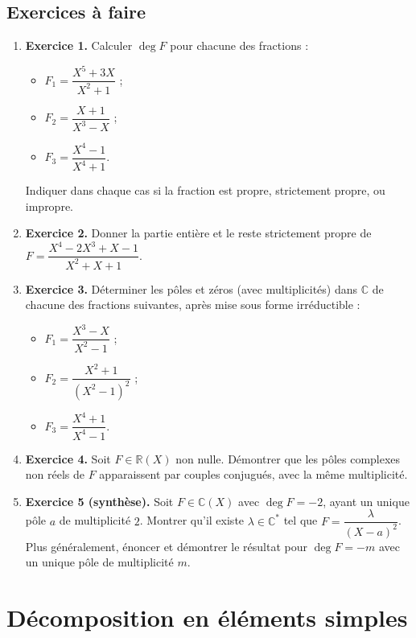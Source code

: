 \documentclass[12pt,a4paper]{report}
\theoremstyle{definition}
\theoremstyle{remark}
\begin{document}
\subsection{Exercices à faire}
\begin{enumerate}
    \item \textbf{Exercice 1.} Calculer $\deg F$ pour chacune des fractions :
    \begin{itemize}
        \item $F_1 = \dfrac{X^5 + 3X}{X^2 + 1}$ ;
        \item $F_2 = \dfrac{X + 1}{X^3 - X}$ ;
        \item $F_3 = \dfrac{X^4 - 1}{X^4 + 1}$.
    \end{itemize}
    Indiquer dans chaque cas si la fraction est propre, strictement propre, ou impropre.
    \item \textbf{Exercice 2.} Donner la partie entière et le reste strictement propre de $F = \dfrac{X^4 - 2X^3 + X - 1}{X^2 + X + 1}$.
    \item \textbf{Exercice 3.} Déterminer les pôles et zéros (avec multiplicités) dans $\mathbb{C}$ de chacune des fractions suivantes, après mise sous forme irréductible :
    \begin{itemize}
        \item $F_1 = \dfrac{X^3 - X}{X^2 - 1}$ ;
        \item $F_2 = \dfrac{X^2 + 1}{(X^2 - 1)^2}$ ;
        \item $F_3 = \dfrac{X^4 + 1}{X^4 - 1}$.
    \end{itemize}
    \item \textbf{Exercice 4.} Soit $F \in \mathbb{R}(X)$ non nulle. Démontrer que les pôles complexes non réels de $F$ apparaissent par couples conjugués, avec la même multiplicité.
    \item \textbf{Exercice 5 (synthèse).} Soit $F \in \mathbb{C}(X)$ avec $\deg F = -2$, ayant un unique pôle $a$ de multiplicité $2$. Montrer qu'il existe $\lambda \in \mathbb{C}^*$ tel que $F = \dfrac{\lambda}{(X - a)^2}$. Plus généralement, énoncer et démontrer le résultat pour $\deg F = -m$ avec un unique pôle de multiplicité $m$.
\end{enumerate}

\section{Décomposition en éléments simples}
\end{document}
